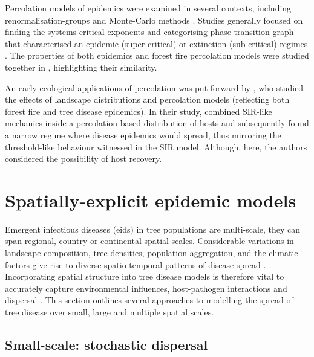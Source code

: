 Percolation models of epidemics were examined in several contexts,
including renormalisation-groups \cite{pub.1060474189} and Monte-Carlo methods \cite{pub.1059069981}. 
Studies generally focused on finding the systems critical exponents and categorising phase
transition graph that characterised an epidemic (super-critical) or extinction (sub-critical) 
regimes \cite{GRASSBERGER1986273}. The properties of both epidemics and forest fire percolation 
models were studied together in \cite{pub.1052857560}, highlighting their similarity.

An early ecological applications of percolation was put forward by \cite{pub.1031591030}, 
who studied the effects of landscape distributions and percolation models 
(reflecting both forest fire and tree disease epidemics). In their study, \cite{pub.1031591030} 
combined SIR-like mechanics inside a percolation-based distribution of hosts and subsequently 
found a narrow regime where disease epidemics would spread, thus mirroring the threshold-like 
behaviour witnessed in the SIR model. Although, here, the authors considered the possibility of host recovery.
\newpage

\section{Spatially-explicit epidemic models}
\label{ch2:lit-rev-compartmentalised-models}

Emergent infectious diseases (\acrshort{eid}s) in tree populations are multi-scale,
they can span regional, country or continental spatial scales. Considerable variations in landscape composition,
tree densities, population aggregation, and the climatic factors give rise to diverse spatio-temporal
patterns of disease spread \cite{he2019integrating, suzuki2003spatial}. Incorporating spatial structure
into tree disease models is therefore vital to accurately capture environmental influences, host-pathogen 
interactions and dispersal \cite{liu2007characterizing}. This section outlines several approaches to modelling
the spread of tree disease over small, large and multiple spatial scales.

\subsection{Small-scale: stochastic dispersal}
\label{ch2:dispersal}

